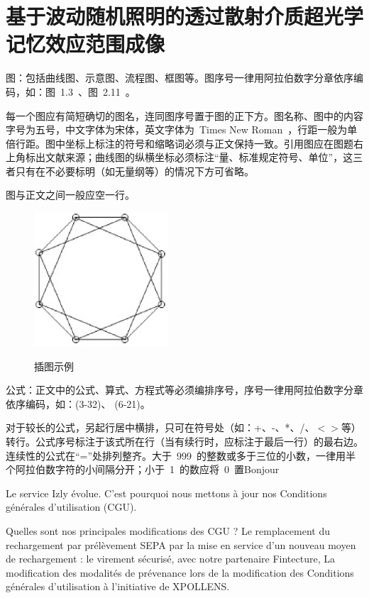 
\chapter{基于波动随机照明的透过散射介质超光学记忆效应范围成像}

图：包括曲线图、示意图、流程图、框图等。图序号一律用阿拉伯数字分章依序编码，如：图~1.3~、图~2.11~。

每一个图应有简短确切的图名，连同图序号置于图的正下方。图名称、图中的内容字号为五号，中文字体为宋体，英文字体为~Times New Roman~，行距一般为单倍行距。图中坐标上标注的符号和缩略词必须与正文保持一致。引用图应在图题右上角标出文献来源；曲线图的纵横坐标必须标注“量、标准规定符号、单位”，这三者只有在不必要标明（如无量纲等）的情况下方可省略。

图与正文之间一般应空一行。

\begin{figure}[!h]
  \centering
  \includegraphics[height=5cm ,width=5cm]{figures/fig.eps}\\
\caption{插图示例}
\end{figure}

公式：正文中的公式、算式、方程式等必须编排序号，序号一律用阿拉伯数字分章依序编码，如：(3-32)、 (6-21)。

对于较长的公式，另起行居中横排，只可在符号处（如：+、-、*、/、$<$$>$等）转行。公式序号标注于该式所在行（当有续行时，应标注于最后一行）的最右边。连续性的公式在“=”处排列整齐。大于~999~的整数或多于三位的小数，一律用半个阿拉伯数字符的小间隔分开；小于~1~的数应将~0~置Bonjour

Le service Izly évolue. C’est pourquoi nous mettons à jour nos Conditions générales d’utilisation (CGU).

Quelles sont nos principales modifications des CGU ?
Le remplacement du rechargement par prélèvement SEPA par la mise en service d’un nouveau moyen de rechargement : le virement sécurisé, avec notre partenaire Fintecture,
La modification des modalités de prévenance lors de la modification des Conditions générales d’utilisation à l’initiative de XPOLLENS.

